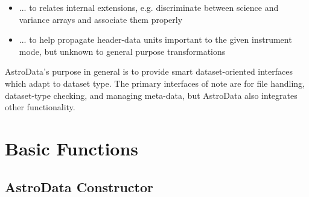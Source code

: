 \documentclass[letterpaper,10pt,english]{sphinxmanual}
\begin{document}
\begin{fulllineitems}
\begin{itemize}
\item {} 
... to relates internal extensions, e.g. discriminate between science and 
variance arrays and associate them properly

\item {} 
... to help propagate header-data units important to the given instrument mode,
but unknown to general purpose transformations

\end{itemize}

AstroData's purpose in general is to provide smart dataset-oriented interfaces
which adapt to dataset type. The primary interfaces of note are for file
handling, dataset-type checking, and managing meta-data, but AstroData also
integrates other functionality.

\end{fulllineitems}



\section{Basic Functions}
\label{chapter_AstroDataClass:basic-functions}

\subsection{AstroData Constructor}
\label{chapter_AstroDataClass:astrodata-constructor}
\end{document}
